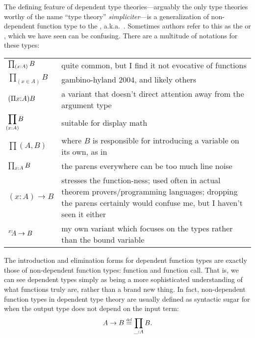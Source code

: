 \documentclass[11pt]{article} %
\theoremstyle{definition}
\theoremstyle{remark}
\begin{document}
The defining feature of dependent type theories---arguably the only type theories worthy of the name ``type theory'' \textit{simpliciter}---is a generalization of non-dependent function type to the , a.k.a.\ .
Sometimes authors refer to this as the \cite{barendregt_1991,martin-lof_1984} or , which we have seen can be confusing.
There are a multitude of notations for these types:
\begin{center}
\renewcommand{\arraystretch}{1.2}
\begin{tabular}{lp{10cm}}
$\prod_{(x \mathord: A)}B$ & quite common, but I find it not evocative of functions \\
$\prod_{(x \in A)}B$ & gambino-hyland 2004, and likely others \\
$(\Pi x \mathord: A)B$ & a variant that doesn't direct attention away from the argument type \cite{awodey-etal_2012} \\
$\displaystyle\prod_{\mathclap{(x : A)}}B$ & suitable for display math \\
$\prod(A, B)$ & where $B$ is responsible for introducing a variable on its own, as in \cite{martin-lof_1984} \\
$\prod_{x \mathord: A} B$ & the parens everywhere can be too much line noise \\
$(x : A) \to B$ & stresses the function-ness; used often in actual theorem provers/programming languages; dropping the parens certainly would confuse me, but I haven't seen it either \\
$\prescript{x:\!\!}{}A \to B$ & my own variant which focuses on the types rather than the bound variable \\
\end{tabular}
\end{center}

The introduction and elimination forms for dependent function types are exactly those of non-dependent function types: function and function call.
That is, we can see dependent types simply as being a more sophisticated understanding of what functions truly are, rather than a brand new thing.
In fact, non-dependent function types in dependent type theory are usually defined as syntactic sugar for when the output type does not depend on the input term:
  $$A \to B \defeq \Pitype{\_}{A}{B}\text{.}$$
\end{document}
